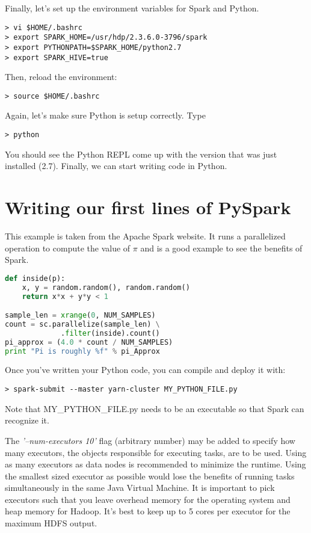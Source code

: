 \documentclass[9pt,twocolumn,twoside]{idsi}
\begin{document}
\noindent
Finally, let's set up the environment variables for Spark and Python.
\begin{verbatim}
> vi $HOME/.bashrc
> export SPARK_HOME=/usr/hdp/2.3.6.0-3796/spark
> export PYTHONPATH=$SPARK_HOME/python2.7
> export SPARK_HIVE=true
\end{verbatim}

\noindent
Then, reload the environment:
\begin{verbatim}
> source $HOME/.bashrc
\end{verbatim}

Again, let's make sure Python is setup correctly. Type
\begin{verbatim}
> python
\end{verbatim}
You should see the Python REPL come up with the version that was just installed (2.7). Finally, we can start writing code in Python.

\section{Writing our first lines of PySpark}

This example is taken from the Apache Spark website. It runs a parallelized operation to compute the value of $\pi$ and is a good example to see the benefits of Spark.

\begin{lstlisting}[language=Python]
def inside(p):
    x, y = random.random(), random.random()
    return x*x + y*y < 1

sample_len = xrange(0, NUM_SAMPLES)
count = sc.parallelize(sample_len) \
             .filter(inside).count()
pi_approx = (4.0 * count / NUM_SAMPLES)
print "Pi is roughly %f" % pi_Approx
\end{lstlisting}

Once you've written your Python code, you can compile and deploy it with:
\begin{verbatim}
> spark-submit --master yarn-cluster MY_PYTHON_FILE.py
\end{verbatim}

\noindent
Note that MY_PYTHON_FILE.py needs to be an executable so that Spark can recognize it.

The \textit{'--num-executors 10'} flag (arbitrary number) may be added to specify how many executors, the objects responsible for executing tasks, are to be used. Using as many executors as data nodes is recommended to minimize the runtime. Using the smallest sized executor as possible would lose the benefits of running tasks simultaneously in the same Java Virtual Machine. It is important to pick executors such that you leave overhead memory for the operating system and heap memory for Hadoop. It's best to keep up to 5 cores per executor for the maximum HDFS output. 
\end{document}
